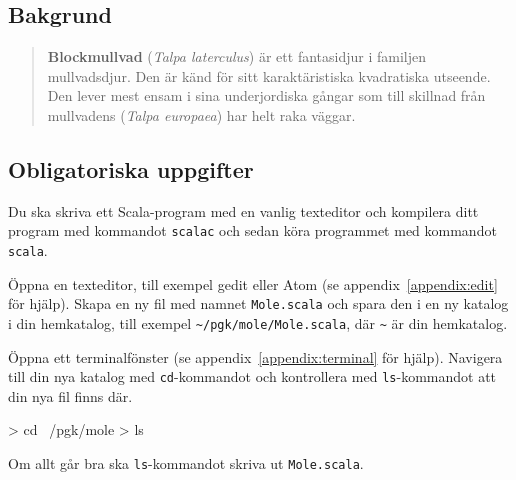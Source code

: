 
\Lab{\LabWeekFOUR}
\begin{Goals}

\end{Goals}

\begin{Preparations}
\item {}
\item {}
\end{Preparations}



\subsection{Bakgrund}


\begin{quote}
\textbf{Blockmullvad} (\textit{Talpa laterculus}) är ett fantasidjur i familjen mullvadsdjur.
Den är känd för sitt karaktäristiska kvadratiska utseende.
Den lever mest ensam i sina underjordiska gångar som till skillnad från mullvadens (\emph{Talpa europaea}) har helt raka väggar.
\end{quote}


\subsection{Obligatoriska uppgifter}


\Task
Du ska skriva ett Scala-program med en vanlig texteditor och kompilera ditt program med kommandot \texttt{scalac} och sedan köra programmet med kommandot \texttt{scala}.

\Subtask
Öppna en texteditor, till exempel gedit eller Atom (se appendix~\ref{appendix:edit} för hjälp).
Skapa en ny fil med namnet \texttt{Mole.scala} och spara den i en ny katalog i din hemkatalog, till exempel \texttt{\textasciitilde/pgk/mole/Mole.scala}, där \texttt{\textasciitilde} är din hemkatalog.

\Subtask
Öppna ett terminalfönster (se appendix~\ref{appendix:terminal} för hjälp).
Navigera till din nya katalog med \texttt{cd}-kommandot  och kontrollera med \texttt{ls}-kommandot  att din nya fil finns där.
\begin{REPLnonum}
> cd ~/pgk/mole
> ls
\end{REPLnonum}
Om allt går bra ska \texttt{ls}-kommandot skriva ut \texttt{Mole.scala}.

